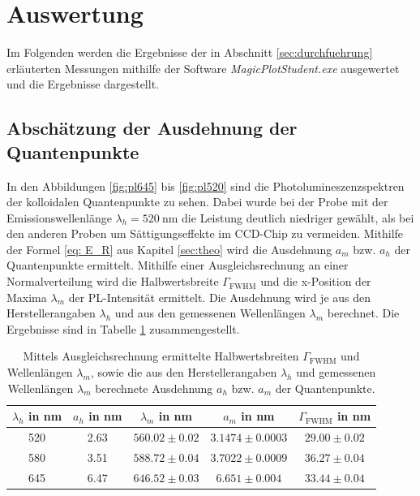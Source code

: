 \newpage
\section{Auswertung}
Im Folgenden werden die Ergebnisse der in Abschnitt \ref{sec:durchfuehrung} erläuterten Messungen mithilfe der Software \textit{MagicPlotStudent.exe} ausgewertet und die Ergebnisse dargestellt. \cite{magicplot}

\subsection{Abschätzung der Ausdehnung der Quantenpunkte}
\label{subsec:31}

In den Abbildungen \ref{fig:pl645} bis \ref{fig:pl520} sind die Photolumineszenzspektren der kolloidalen Quantenpunkte zu sehen. Dabei wurde bei der Probe mit der Emissionswellenlänge $\lambda_h=\SI{520}{\nano\meter}$ die Leistung
deutlich niedriger gewählt, als bei den anderen Proben um Sättigungseffekte im CCD-Chip zu vermeiden. Mithilfe der Formel \ref{eq: E_R} aus Kapitel \ref{sec:theo} wird die Ausdehnung $a_m$ bzw. $a_h$ der Quantenpunkte ermittelt. Mithilfe einer Ausgleichsrechnung an einer Normalverteilung wird die Halbwertsbreite $\Gamma_{\text{FWHM}}$ und die x-Position der Maxima $\lambda_m$ der PL-Intensität ermittelt. Die Ausdehnung wird je aus den Herstellerangaben $\lambda_h$ und aus den gemessenen Wellenlängen $\lambda_m$ berechnet. Die Ergebnisse sind in Tabelle \ref{tab:ausdehnung} zusammengestellt.
\begin{table}[H]
  \centering
  \caption{Mittels Ausgleichsrechnung ermittelte Halbwertsbreiten $\Gamma_{\text{FWHM}}$ und Wellenlängen $\lambda_m$, sowie die aus den Herstellerangaben $\lambda_h$ und gemessenen Wellenlängen $\lambda_m$ berechnete Ausdehnung $a_h$ bzw. $a_m$ der Quantenpunkte.}
  \label{tab:ausdehnung}
  \begin{tabular}{c|c|c|c|c}
    \toprule
    $\lambda_h$ in nm & $a_h$ in nm & $\lambda_m$ in nm & $a_m$ in nm & $\Gamma_{\text{FWHM}}$ in nm\\
    \midrule
    520 & 2.63 & $560.02 \pm 0.02$ & $3.1474 \pm 0.0003$ & $29.00 \pm 0.02$ \\
    580 & 3.51 & $588.72 \pm 0.04$ & $3.7022 \pm 0.0009$ & $36.27 \pm 0.04$ \\
    645 & 6.47 & $646.52 \pm 0.03$ & $ 6.651 \pm 0.004 $ & $33.44 \pm 0.04$ \\
    \bottomrule
  \end{tabular}
\end{table}
